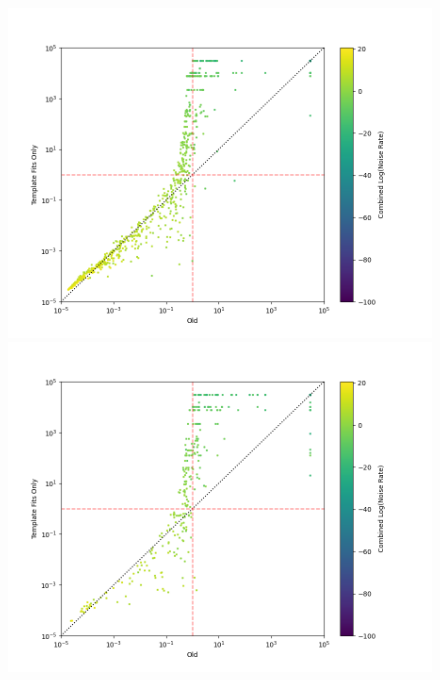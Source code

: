 %
\begin{figure}
  \centering
  \begin{minipage}[t]{1.0\linewidth}
  
    \includegraphics[width=1\textwidth]{images/pycbclive/ifar_vs_ifar_same_template_ids_comb_log_noise.png}
    \caption{}
    \label{fig:pycbclive-ifar-ifar-same-trigs-comb-log-noise-rate}
  
  
    \includegraphics[width=1\textwidth]{images/pycbclive/ifar_vs_ifar_diff_template_ids_comb_log_noise.png}
    \caption{}
    \label{fig:pycbclive-ifar-ifar-diff-trigs-comb-log-noise-rate}
  
  \end{minipage}
\end{figure}
